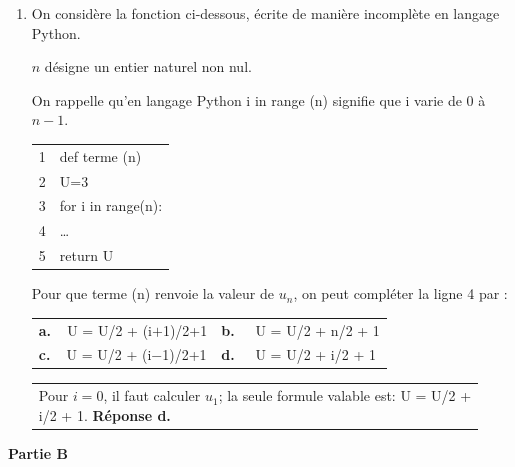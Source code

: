 \documentclass[10pt]{article}
\providecommand{\dotfill}{\ldots}
\begin{document}
\begin{enumerate}
\medskip

\item On considère la fonction ci-dessous, écrite de manière incomplète en langage Python.

\begin{minipage}{0.58\linewidth}
$n$ désigne un entier naturel non nul. 

On rappelle qu'en langage Python
\og i in range (n)\fg{} signifie que i varie de 0 à $n-1$.
\end{minipage}\hfill
\begin{minipage}{0.38\linewidth}
\begin{tabular}{|c|l|}\hline
1&def terme (n)\\
2&\qquad U=3\\
3&\qquad for i in range(n): \\
4& \dotfill \\
5&\qquad return U\\ \hline
\end{tabular}
\end{minipage}

Pour que terme (n) renvoie la valeur de $u_n$, on peut compléter la ligne 4 par : 

\begin{center}
\begin{tabularx}{\linewidth}{*{2}{X}}
\textbf{a.~~}U = U/2 + (i$+$1)/2+1	&\textbf{b.~~} U = U/2 + n/2 + 1\\
\textbf{c.~~}U = U/2 + (i$-$1)/2+1 	&\textbf{d.~~} U = U/2 + i/2 + 1
\end{tabularx}
\end{center}

\begin{tabular}{@{\hspace*{0.05\linewidth}} || p{0.93\linewidth}}
Pour $i=0$, il faut calculer $u_1$; la seule formule valable est: U = U/2 + i/2 + 1.
\hfill\textbf{Réponse d.}
\end{tabular}

\end{enumerate}

\bigskip

\textbf{Partie B}

\medskip
\end{document}
